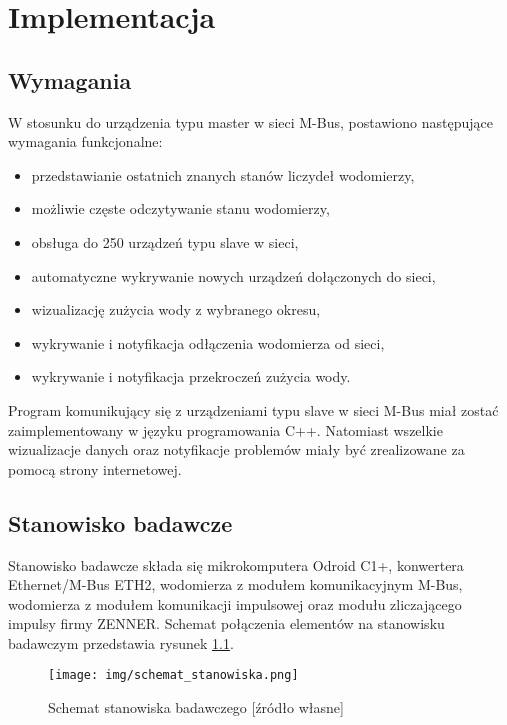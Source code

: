 \chapter{Implementacja}
\label{cha:implementacja}

\section{Wymagania}

W stosunku do urządzenia typu master w sieci M-Bus, postawiono następujące wymagania funkcjonalne:
\begin{itemize}
	\item przedstawianie ostatnich znanych stanów liczydeł wodomierzy,
	\item możliwie częste odczytywanie stanu wodomierzy,
	\item obsługa do 250 urządzeń typu slave w sieci,
	\item automatyczne wykrywanie nowych urządzeń dołączonych do sieci,
	\item wizualizację zużycia wody z wybranego okresu,
	\item wykrywanie i notyfikacja odłączenia wodomierza od sieci,
	\item wykrywanie i notyfikacja przekroczeń zużycia wody.
\end{itemize}

Program komunikujący się z urządzeniami typu slave w sieci M-Bus miał zostać zaimplementowany w języku programowania C++.
Natomiast wszelkie wizualizacje danych oraz notyfikacje problemów miały być zrealizowane za pomocą strony internetowej.

\section{Stanowisko badawcze}

Stanowisko badawcze składa się mikrokomputera Odroid C1+, konwertera Ethernet/M-Bus ETH2,
wodomierza z modułem komunikacyjnym M-Bus, wodomierza z modułem komunikacji impulsowej oraz modułu zliczającego impulsy firmy ZENNER.
Schemat połączenia elementów na stanowisku badawczym przedstawia rysunek \ref{fig:diagram_of_test_bench}.

\begin{figure}[ht]
	\centering
	\texttt{[image: img/schemat\_stanowiska.png]}
	\caption[Schemat stanowiska badawczego]{Schemat stanowiska badawczego [źródło własne]}
	\label{fig:diagram_of_test_bench}
\end{figure}

